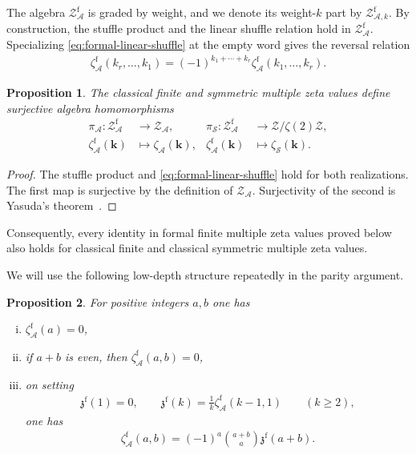 \documentclass[12pt]{amsart}
\numberwithin{equation}{section}
\theoremstyle{plain}
\newtheorem{prop}[prop]{Proposition}
\newcommand{\ZA}{{\mathcal Z_{\mathcal A}}}
\newcommand{\ZAf}{{\mathcal Z_{\mathcal A}^{\mathrm f}}}
\newcommand{\ZAfw}[1]{{\mathcal Z_{\mathcal A,#1}^{\mathrm f}}}
\newcommand{\za}[1]{\zeta_{\mathcal A}(#1)}
\newcommand{\zs}[1]{\zeta_{\mathcal S}(#1)}
\newcommand{\zaf}[1]{\zeta_{\mathcal A}^{\mathrm f}(#1)}
\newcommand{\zzf}[1]{\mathfrak z^{\mathrm f}(#1)}
\begin{document}
The algebra $\ZAf$ is graded by weight, and we denote its weight-$k$ part by $\ZAfw{k}$. By construction, the stuffle product and the linear shuffle relation hold in $\ZAf$. Specializing \eqref{eq:formal-linear-shuffle} at the empty word gives the reversal relation
\begin{align}\label{eq:formal-reversal}
 \zaf{k_r,\ldots,k_1}=(-1)^{k_1+\cdots+k_r}\zaf{k_1,\ldots,k_r}.
\end{align}

\begin{prop}\label{prop:realizations}
The classical finite and symmetric multiple zeta values define surjective
algebra homomorphisms
\begin{align*}
 \pi_{\mathcal A}:\ZAf&\longrightarrow\ZA,
 &\pi_{\mathcal S}:\ZAf&\longrightarrow
      \mathcal Z/\zeta(2)\mathcal Z,\\
 \zaf{\boldsymbol{k}}&\longmapsto\za{\boldsymbol{k}},
 &\zaf{\boldsymbol{k}}&\longmapsto\zs{\boldsymbol{k}}.
\end{align*}
\end{prop}

\begin{proof}
The stuffle product and \eqref{eq:formal-linear-shuffle} hold for both realizations. The first map is surjective by the definition of $\ZA$. Surjectivity of the second is Yasuda's theorem~\cite{Yasuda}.
\end{proof}

Consequently, every identity in formal finite multiple zeta values proved
below also holds for classical finite
and classical symmetric multiple zeta values.

We will use the following low-depth structure repeatedly in the parity argument.

\begin{prop}\label{prop:low-depth}
For positive integers $a,b$ one has
\begin{enumerate}[(i)]
 \item $\zaf{a}=0$,
 \item if $a+b$ is even, then $\zaf{a,b}=0$,
 \item on setting
 \begin{align}\label{eq:true-single}
  \zzf{1}=0,\qquad \zzf{k}=\frac1k\zaf{k-1,1}\qquad(k\geq2),
 \end{align}
 one has
 \begin{align}\label{eq:formal-double-evaluation}
  \zaf{a,b}=(-1)^a\binom{a+b}{a}\zzf{a+b}.
 \end{align}
\end{enumerate}
\end{prop}
\end{document}
